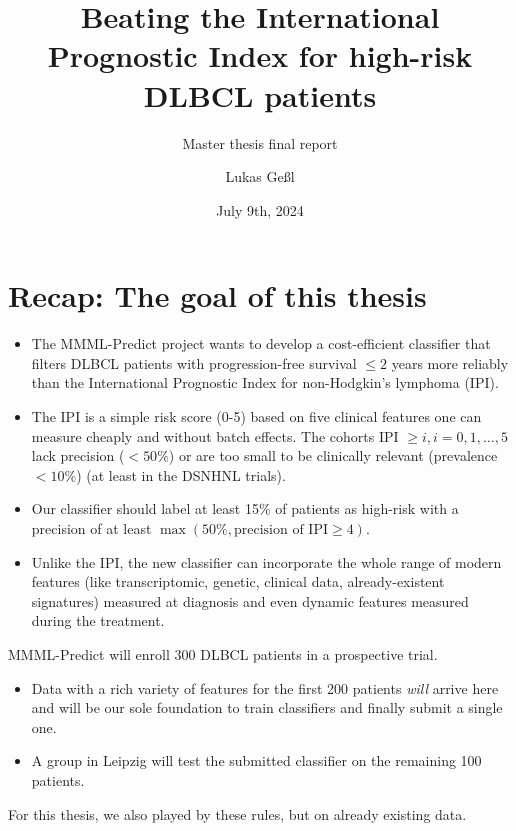 \documentclass[10pt, aspectratio=169]{beamer}
\title{Beating the International Prognostic Index for high-risk DLBCL patients}
\subtitle{Master thesis final report}
\date{July 9th, 2024}
\author{Lukas Geßl}
\institute{Chair of Statistical Bioinformatics, Regensburg University}
\begin{document}
\maketitle

\section{Recap: The goal of this thesis}

\begin{frame}{}
  \begin{itemize}
    \item The MMML-Predict project wants to develop a cost-efficient classifier 
    that filters DLBCL patients with progression-free survival $\leq 2$ years more reliably 
    than the International Prognostic Index for non-Hodgkin's lymphoma (IPI).
    \pause
    \item The IPI \cite{ipi93} is a simple risk score (0-5) based on five clinical features one can
    measure cheaply and without batch effects. The cohorts IPI $\geq i, i = 0, 1, \ldots, 5$
    lack precision ($< 50 \%$) or are too small to be clinically relevant
    (prevalence $< 10 \%$) (at least in the DSNHNL trials).
    \item Our classifier should label at least 15\% of patients as high-risk with a precision
    of at least $\max(50\%, \text{precision of IPI} \geq 4)$.
    \pause
    \item Unlike the IPI, the new classifier can incorporate the whole range of 
    modern features (like transcriptomic, genetic, clinical data, already-existent 
    signatures) measured at diagnosis and even dynamic features measured during 
    the treatment.
  \end{itemize}
\end{frame}

\begin{frame}
  MMML-Predict will enroll 300 DLBCL patients in a prospective trial.
  \begin{itemize}
    \item Data with a rich variety of features for the first 200 patients 
      \textit{will} arrive here and will be our sole foundation to train 
        classifiers and finally submit a single one.
    \item A group in Leipzig will test the submitted classifier on the remaining 
      100 patients.
  \end{itemize}
  \pause
  For this thesis, we also played by these rules, but on already existing data.
\end{frame}
\end{document}
